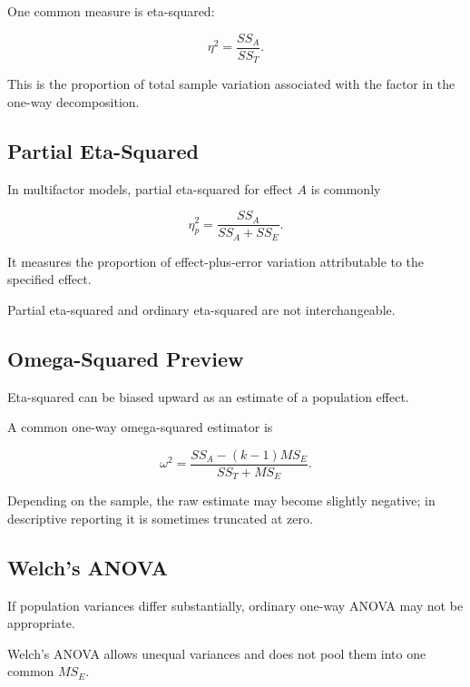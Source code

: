 One common measure is eta-squared:

\[
\boxed{
\eta^2
=
\frac{
SS_A
}{
SS_T
}.
}
\]

This is the proportion of total sample variation associated with the
factor in the one-way decomposition.

\subsection{Partial Eta-Squared}
\label{subsec:partial-eta-squared}

In multifactor models, partial eta-squared for effect \(A\) is commonly

\[
\boxed{
\eta_p^2
=
\frac{
SS_A
}{
SS_A+SS_E
}.
}
\]

It measures the proportion of effect-plus-error variation attributable to
the specified effect.

Partial eta-squared and ordinary eta-squared are not interchangeable.

\subsection{Omega-Squared Preview}
\label{subsec:omega-squared-preview}

Eta-squared can be biased upward as an estimate of a population effect.

A common one-way omega-squared estimator is

\[
\boxed{
\omega^2
=
\frac{
SS_A
-
(k-1)MS_E
}{
SS_T+MS_E
}.
}
\]

Depending on the sample, the raw estimate may become slightly negative;
in descriptive reporting it is sometimes truncated at zero.

\subsection{Welch's ANOVA}
\label{subsec:welch-anova}

If population variances differ substantially, ordinary one-way ANOVA may
not be appropriate.

Welch's ANOVA allows unequal variances and does not pool them into one
common \(MS_E\).


